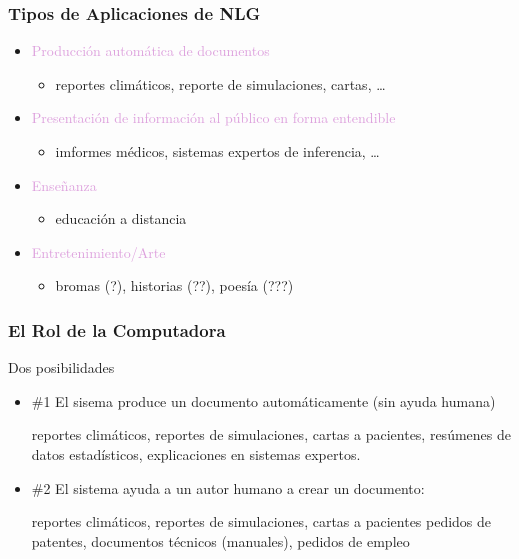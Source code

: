 \documentclass[compress,color=usenames]{beamer}
\newcommand{\mH}[1]{\textcolor{Plum}{#1}}
\begin{document}
\begin{frame}
\frametitle{Tipos de Aplicaciones de NLG}

\begin{itemize}
\item \mH{Producci\'on autom\'atica de documentos}
\begin{itemize}
\item reportes clim\'aticos, reporte de simulaciones, cartas, \ldots
\end{itemize}
\item \mH{Presentaci\'on de informaci\'on al p\'ublico en forma entendible}
\begin{itemize}
\item imformes m\'edicos, sistemas expertos de inferencia, \ldots
\end{itemize}
\item \mH{Ense\~nanza}
\begin{itemize}
\item educaci\'on a distancia
\end{itemize}
\item \mH{Entretenimiento/Arte}
\begin{itemize}
\item bromas (?), historias (??), poes\'ia (???)
\end{itemize}
\end{itemize}

\end{frame}

\begin{frame}
\frametitle{El Rol de la Computadora}

 Dos posibilidades
\begin{itemize}
\item \#1 El sisema produce un documento autom\'aticamente (sin ayuda humana) 

 reportes clim\'aticos, reportes de simulaciones, cartas a pacientes,
 res\'umenes de datos estad\'isticos, explicaciones en sistemas expertos.

\item \#2 El sistema ayuda a un autor humano a crear un documento:

 reportes clim\'aticos, reportes de simulaciones, cartas a pacientes
 pedidos de patentes, documentos t\'ecnicos (manuales), pedidos de empleo
\end{itemize}

\end{frame}
\end{document}
